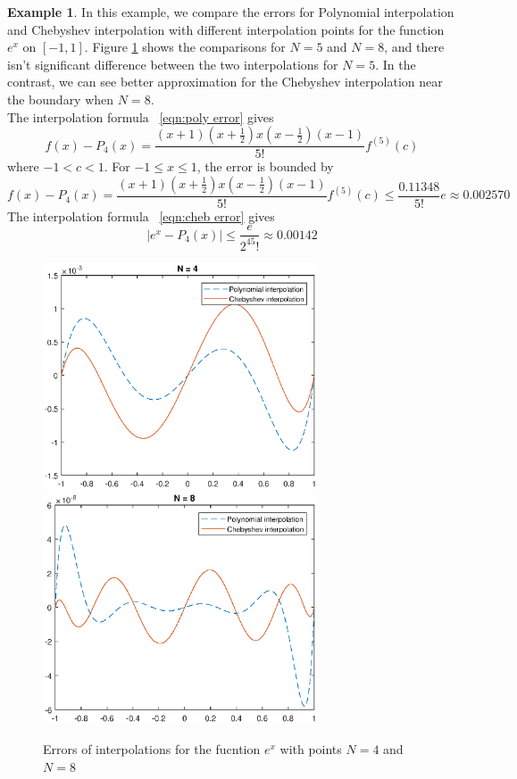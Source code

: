 \documentclass[12pt]{amsart}
\theoremstyle{definition}
\newtheorem{exmp}{Example}[section]
\begin{document}
\begin{exmp}
In this example, we compare the errors for Polynomial interpolation and Chebyshev interpolation with different interpolation points for the function $e^x$ on $[-1,1]$. Figure \ref{fig:e1} shows the comparisons for $N=5$ and $N=8$, and there isn't significant difference between the two interpolations for $N=5$. In the contrast, we can see better approximation for the Chebyshev interpolation near the boundary when  $N=8$.\\
The interpolation formula ~\eqref{eqn:poly error} gives 
\begin{equation}
f(x)-P_4(x)=\frac{(x+1)(x+\frac{1}{2})x(x-\frac{1}{2})(x-1)}{5!}f^{(5)}(c)
\end{equation}
where $-1<c<1$. For $-1\leq x\leq 1$, the error is bounded by
\begin{equation*}
f(x)-P_4(x)=\frac{(x+1)(x+\frac{1}{2})x(x-\frac{1}{2})(x-1)}{5!}f^{(5)}(c)\leq \frac{0.11348}{5!}e\approx 0.002570
\end{equation*}
The interpolation formula ~\eqref{eqn:cheb error} gives 
\begin{equation*}
|e^x-P_4(x)|\leq \frac{e}{2^45!}\approx 0.00142
\end{equation*}

\begin{figure}     	\centerline{\includegraphics[width=3.2in]{e1a.eps}
      	\hspace{-6pt}
     	\includegraphics[width=3.2in]{e1b.eps}}
     	\hspace{-6pt}
		\caption{Errors of interpolations for the fucntion $e^x$ with points $N=4$ and $N=8$}
        \label{fig:e1}
\end{figure}
\end{exmp}
\end{document}
